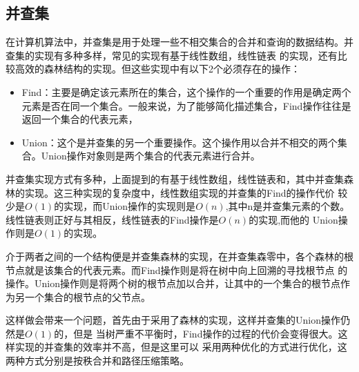 \subsection{并查集}
在计算机算法中，并查集是用于处理一些不相交集合的合并和查询的数据结构。并查集的实现有多种多样，常见的实现有基于线性数组，线性链表
的实现，还有比较高效的森林结构的实现。但这些实现中有以下2个必须存在的操作：
\begin{itemize}
\item Find：主要是确定该元素所在的集合，这个操作的一个重要的作用是确定两个元素是否在同一个集合。一般来说，为了能够简化描述集合，Find操作往往是返回一个集合的代表元素，
\item Union：这个是并查集的另一个重要操作。这个操作用以合并不相交的两个集合。Union操作对象则是两个集合的代表元素进行合并。
\end{itemize}

并查集实现方式有多种，上面提到的有基于线性数组，线性链表和，其中并查集森林的实现。这三种实现的复杂度中，线性数组实现的并查集的Find的操作代价
较少是$O(1)$的实现，而Union操作的实现则是$O(n)$,其中n是并查集元素的个数。线性链表则正好与其相反，线性链表的Find操作是$O(n)$的实现,而他的
Union操作则是$O(1)$的实现。

介于两者之间的一个结构便是并查集森林的实现，在并查集森零中，各个森林的根节点就是该集合的代表元素。而Find操作则是将在树中向上回溯的寻找根节点
的操作。Union操作则是将两个树的根节点加以合并，让其中的一个集合的根节点作为另一个集合的根节点的父节点。

这样做会带来一个问题，首先由于采用了森林的实现，这样并查集的Union操作仍然是$O(1)$的，但是
当树严重不平衡时，Find操作的过程的代价会变得很大。这样实现的并查集的效率并不高，但是这里可以
采用两种优化的方式进行优化，这两种方式分别是按秩合并和路径压缩策略。

